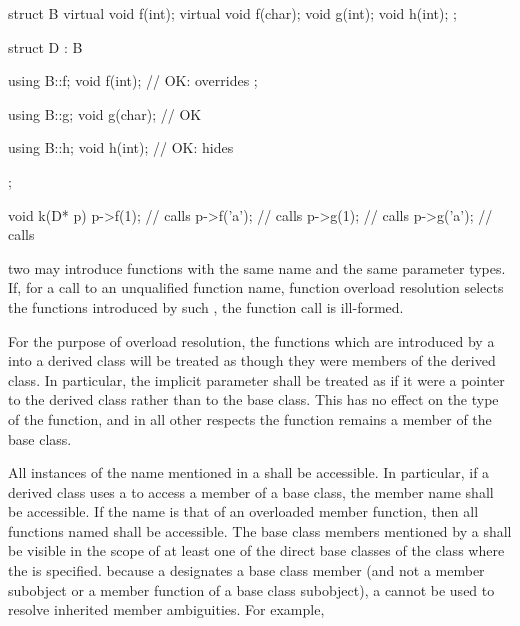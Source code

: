 \begin{codeblock}
struct B {
	virtual void f(int);
	virtual void f(char);
	void g(int);
	void h(int);
};

struct D : B {
	using B::f;
	void f(int);		// OK:  overrides ;

	using B::g;
	void g(char);		// OK

	using B::h;
	void h(int);		// OK:  hides 
};

void k(D* p)
{
	p->f(1);		// calls 
	p->f('a');		// calls 
	p->g(1);		// calls 
	p->g('a');		// calls 
}
\end{codeblock}
\exitexampleb
\enternote
two  may introduce functions with the
same name and the same parameter types. If, for a call to an unqualified
function name, function overload resolution selects the functions introduced
by such , the function call is ill-formed.
\exitnote

\pnum
{}%
For the purpose of overload resolution, the functions which are
introduced by a  into a derived class will
be treated as though they were members of the derived class. In
particular, the implicit  parameter shall be treated as if
it were a pointer to the derived class rather than to the base class.
This has no effect on the type of the function, and in all other
respects the function remains a member of the base class.

\pnum
{}%
All instances of the name mentioned in a 
shall be accessible. In particular, if a derived class uses a
 to access a member of a base class, the
member name shall be accessible. If the name is that of an overloaded
member function, then all functions named shall be accessible. The base
class members mentioned by a  shall be
visible in the scope of at least one of the direct base classes of the
class where the  is specified. \enternote
because a  designates a base class member
(and not a member subobject or a member function of a base class
subobject), a  cannot be used to resolve
inherited member ambiguities. For example,

